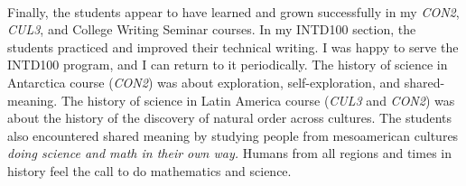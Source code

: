 \documentclass[../../../main.tex]{subfiles}
\begin{document}
\\
\vspace{0.15cm}
Finally, the students appear to have learned and grown successfully in my \textit{CON2}, \textit{CUL3}, and College Writing Seminar courses.  In my INTD100 section, the students practiced and improved their technical writing.  I was happy to serve the INTD100 program, and I can return to it periodically.  The history of science in Antarctica course (\textit{CON2}) was about exploration, self-exploration, and shared-meaning.  The history of science in Latin America course (\textit{CUL3} and \textit{CON2}) was about the history of the discovery of natural order across cultures.  The students also encountered shared meaning by studying people from mesoamerican cultures \textit{doing science and math in their own way.}  Humans from all regions and times in history feel the call to do mathematics and science.
\end{document}
